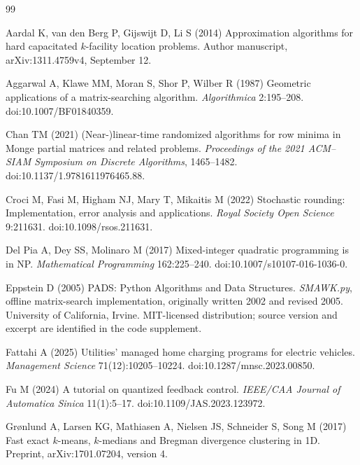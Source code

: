 \begin{thebibliography}{99}\raggedright
{}
Aardal K, van den Berg P, Gijswijt D, Li S (2014) Approximation algorithms for hard capacitated $k$-facility location problems. Author manuscript, arXiv:1311.4759v4, September 12.

Aggarwal A, Klawe MM, Moran S, Shor P, Wilber R (1987) Geometric applications of a matrix-searching algorithm. \emph{Algorithmica} 2:195--208. doi:10.1007/BF01840359.

Chan TM (2021) (Near-)linear-time randomized algorithms for row minima in Monge partial matrices and related problems. \emph{Proceedings of the 2021 ACM--SIAM Symposium on Discrete Algorithms}, 1465--1482. doi:10.1137/1.9781611976465.88.

Croci M, Fasi M, Higham NJ, Mary T, Mikaitis M (2022) Stochastic rounding: Implementation, error analysis and applications. \emph{Royal Society Open Science} 9:211631. doi:10.1098/rsos.211631.

Del Pia A, Dey SS, Molinaro M (2017) Mixed-integer quadratic programming is in NP. \emph{Mathematical Programming} 162:225--240. doi:10.1007/s10107-016-1036-0.

Eppstein D (2005) PADS: Python Algorithms and Data Structures. \emph{SMAWK.py}, offline matrix-search implementation, originally written 2002 and revised 2005. University of California, Irvine. MIT-licensed distribution; source version and excerpt are identified in the code supplement.

Fattahi A (2025) Utilities' managed home charging programs for electric vehicles. \emph{Management Science} 71(12):10205--10224. doi:10.1287/mnsc.2023.00850.

Fu M (2024) A tutorial on quantized feedback control. \emph{IEEE/CAA Journal of Automatica Sinica} 11(1):5--17. doi:10.1109/JAS.2023.123972.

Gr{\o}nlund A, Larsen KG, Mathiasen A, Nielsen JS, Schneider S, Song M (2017) Fast exact $k$-means, $k$-medians and Bregman divergence clustering in 1D. Preprint, arXiv:1701.07204, version 4.


\end{thebibliography}
